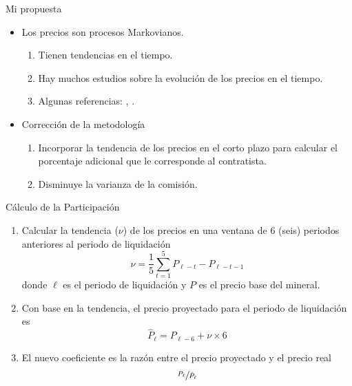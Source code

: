\documentclass[usenames,dvipsnames]{beamer}
\begin{document}
\begin{frame}{Mi propuesta}
\begin{itemize}
    \item Los precios son procesos Markovianos.
    \begin{enumerate}
        \item Tienen tendencias en el tiempo.
        \item Hay muchos estudios sobre la evolución de los precios en el tiempo. 
        \item Algunas referencias: \citet{Nag20}, \citet{Ryan73}. 
    \end{enumerate}
    \item Corrección de la metodología
    \begin{enumerate}
        \item Incorporar la tendencia de los precios en el corto plazo para calcular el porcentaje adicional que le corresponde al contratista. 
        \item Disminuye la varianza de la comisión. 
    \end{enumerate}
\end{itemize}
\end{frame}

\begin{frame}{Cálculo de la Participación}
    \begin{enumerate}
        \item Calcular la tendencia ($\nu$) de los precios en una ventana de 6 (seis) periodos anteriores al periodo de liquidación
        \begin{equation*}
            \nu = \frac{1}{5}\sum_{t=1}^5 P_{\ell-t}-P_{\ell-t-1}
        \end{equation*}
        donde $\ell$ es el periodo de liquidación y $P$ es el precio base del mineral.  
        \item Con base en la tendencia, el precio proyectado para el periodo de liquidación es
        \begin{equation*}
            \hat{P}_\ell = P_{\ell-6} + \nu\times6
        \end{equation*}
        \item El nuevo coeficiente es la razón entre el precio proyectado y el precio real
        \begin{equation*}
            \sfrac{P_\ell}{\hat{P}_\ell}
        \end{equation*}
    \end{enumerate}
\end{frame}
\end{document}
